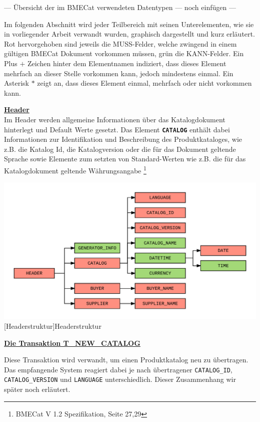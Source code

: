 	--- Übersicht der im BMECat verwendeten Datentypen --- noch einfügen ---
	
	Im folgenden Abschnitt wird jeder Teilbereich mit seinen Unterelementen, wie sie in vorliegender Arbeit verwandt wurden, graphisch dargestellt und kurz erläutert. Rot hervorgehoben sind jeweils die MUSS-Felder, welche zwingend in einem gültigen BMECat Dokument vorkommen müssen, grün die KANN-Felder. Ein Plus \(+\) Zeichen hinter dem Elementnamen indiziert, dass dieses Element mehrfach an dieser Stelle vorkommen kann, jedoch mindestens einmal. Ein Asterisk \(*\) zeigt an, dass dieses Element einmal, mehrfach oder nicht vorkommen kann.  
	
	\textbf{\underline{Header}}\\
	Im Header werden allgemeine Informationen über das Katalogdokument hinterlegt und Default Werte gesetzt. Das Element \texttt{\textbf{CATALOG}} enthält dabei Informationen zur Identifikation und Beschreibung des Produktkataloges, wie z.B. die Katalog Id, die Katalogversion oder die für das Dokument geltende Sprache sowie Elemente zum setzten von Standard-Werten wie z.B. die für das Katalogdokument geltende Währungsangabe \footnote{BMECat V 1.2 Spezifikation, Seite 27,29} 
	
	\begin{minipage}{\linewidth}
		\vspace{1em}
		\centering
		\includegraphics[width=0.7\linewidth]{img/BMECat_Header}
		[Headerstruktur]{Headerstruktur}
		\label{fig:header}
		\vspace{1em}
	\end{minipage}
	
	
	
	\textbf{\underline{Die Transaktion T\_NEW\_CATALOG}}
	
	Diese Transaktion wird verwandt, um einen Produktkatalog neu zu übertragen. Das empfangende System reagiert dabei je nach übertragener \texttt{CATALOG\_ID}, \texttt{CATALOG\_VERSION}
	und \texttt{LANGUAGE} unterschiedlich. Dieser Zusammenhang wir später noch erläutert.
	
